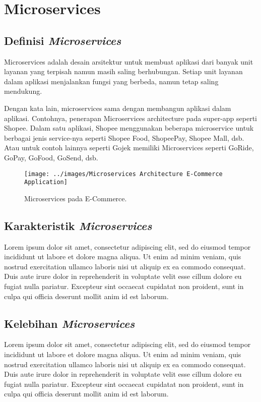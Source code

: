 \chapter{Microservices}

\section{Definisi \textit{Microservices}}

Microservices adalah desain arsitektur untuk membuat aplikasi dari banyak unit layanan yang terpisah namun masih saling berhubungan. Setiap unit layanan dalam aplikasi menjalankan fungsi yang berbeda, namun tetap saling mendukung.

Dengan kata lain, microservices sama dengan membangun aplikasi dalam aplikasi. Contohnya, penerapan Microservices architecture pada super-app seperti Shopee. Dalam satu aplikasi, Shopee menggunakan beberapa microservice untuk berbagai jenis service-nya seperti Shopee Food, ShopeePay, Shopee Mall, dsb. Atau untuk contoh lainnya seperti Gojek memiliki Microservices seperti GoRide, GoPay, GoFood, GoSend, dsb.

\begin{figure}[h]
	\centering
	\texttt{[image: ../images/Microservices Architecture E-Commerce Application]}
	\caption{Microservices pada E-Commerce.}
\end{figure}

\section{Karakteristik \textit{Microservices}}

Lorem ipsum dolor sit amet, consectetur adipiscing elit, sed do eiusmod tempor incididunt ut labore et dolore magna aliqua. Ut enim ad minim veniam, quis nostrud exercitation ullamco laboris nisi ut aliquip ex ea commodo consequat. Duis aute irure dolor in reprehenderit in voluptate velit esse cillum dolore eu fugiat nulla pariatur. Excepteur sint occaecat cupidatat non proident, sunt in culpa qui officia deserunt mollit anim id est laborum.

\section{Kelebihan \textit{Microservices}}

Lorem ipsum dolor sit amet, consectetur adipiscing elit, sed do eiusmod tempor incididunt ut labore et dolore magna aliqua. Ut enim ad minim veniam, quis nostrud exercitation ullamco laboris nisi ut aliquip ex ea commodo consequat. Duis aute irure dolor in reprehenderit in voluptate velit esse cillum dolore eu fugiat nulla pariatur. Excepteur sint occaecat cupidatat non proident, sunt in culpa qui officia deserunt mollit anim id est laborum.

